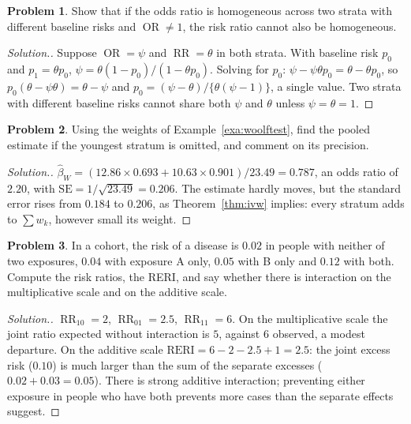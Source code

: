 \documentclass[11pt,a4paper]{article}
\numberwithin{equation}{section}
\DeclareMathOperator{\OR}{OR}
\DeclareMathOperator{\RR}{RR}
\theoremstyle{definition}
\newtheorem{problemx}{Problem}[subsection]
\newenvironment{problem}{\begin{problemx}}{\end{problemx}}
\newenvironment{solution}
  {\renewcommand{\qedsymbol}{}\begin{proof}[\textit{Solution}.]}
  {\end{proof}}
\begin{document}
\begin{problem}
Show that if the odds ratio is homogeneous across two strata with different baseline risks and $\OR \neq 1$, the risk ratio cannot also be
homogeneous.
\end{problem}

\begin{solution}
Suppose $\OR = \psi$ and $\RR = \theta$ in both strata. With baseline risk $p_0$ and $p_1 = \theta p_0$, $\psi = \theta(1 - p_0)/(1 - \theta p_0)$. Solving for $p_0$:
$\psi - \psi\theta p_0 = \theta - \theta p_0$, so $p_0(\theta - \psi\theta) = \theta - \psi$ and $p_0 = (\psi - \theta)/\{\theta(\psi - 1)\}$, a single value. Two strata with
different baseline risks cannot share both $\psi$ and $\theta$ unless $\psi = \theta = 1$.
\end{solution}

\begin{problem}
Using the weights of Example~\ref{exa:woolftest}, find the pooled estimate if the youngest stratum is omitted, and comment on its
precision.
\end{problem}

\begin{solution}
$\hat\beta_W = (12.86 \times 0.693 + 10.63 \times 0.901)/23.49 = 0.787$, an odds ratio of $2.20$, with $\text{SE} = 1/\sqrt{23.49} = 0.206$. The estimate hardly moves, but
the standard error rises from $0.184$ to $0.206$, as Theorem~\ref{thm:ivw} implies: every stratum adds to $\sum w_k$, however small its weight.
\end{solution}

\begin{problem}
In a cohort, the risk of a disease is $0.02$ in people with neither of two exposures, $0.04$ with exposure A only, $0.05$ with B only and $0.12$
with both. Compute the risk ratios, the RERI, and say whether there is interaction on the multiplicative scale and on the additive scale.
\end{problem}

\begin{solution}
$\RR_{10} = 2$, $\RR_{01} = 2.5$, $\RR_{11} = 6$. On the multiplicative scale the joint ratio expected without interaction is $5$, against $6$ observed, a
modest departure. On the additive scale $\text{RERI} = 6 - 2 - 2.5 + 1 = 2.5$: the joint excess risk ($0.10$) is much larger than the sum of the separate
excesses ($0.02 + 0.03 = 0.05$). There is strong additive interaction; preventing either exposure in people who have both prevents more cases
than the separate effects suggest.
\end{solution}
\end{document}
